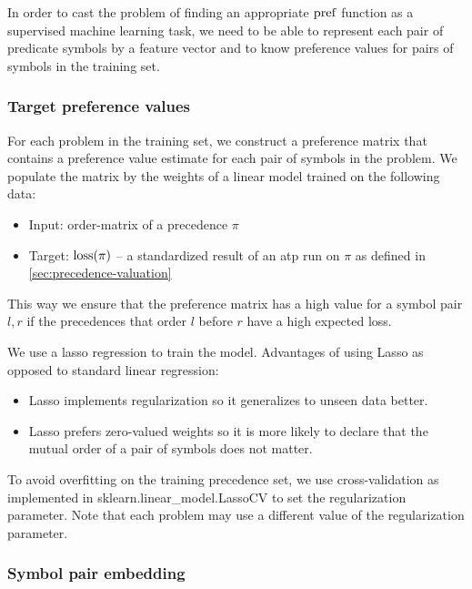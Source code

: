 In order to cast the problem of finding an appropriate \(\operatorname{pref}\) function
as a supervised machine learning task,
we need to be able to represent each pair of predicate symbols by a feature vector
and to know preference values for pairs of symbols in the training set.

\subsubsection{Target preference values}

For each problem in the training set, we construct a preference matrix that contains a preference
value estimate for each pair of symbols in the problem.
We populate the matrix by the weights of a linear model trained on the following data:

\begin{itemize}
	\item Input: \Gls{order-matrix} of a precedence \(\pi\)
	\item Target: \(\operatorname{loss}(\pi)\) --
	a standardized result of an \gls{atp} run on \(\pi\) as defined in \autoref{sec:precedence-valuation}
\end{itemize}

This way we ensure that the preference matrix has a high value for a symbol pair \(l, r\)
if the precedences that order \(l\) before \(r\) have a high expected loss.

We use a lasso regression \cite{?} to train the model.
Advantages of using Lasso as opposed to standard linear regression\cite{?}:

\begin{itemize}
	\item Lasso implements regularization so it generalizes to unseen data better.
	\item Lasso prefers zero-valued weights so it is more likely to declare that the mutual order of a pair of symbols does not matter.
\end{itemize}

To avoid overfitting on the training precedence set,
we use cross-validation as implemented in sklearn.linear\_model.LassoCV \cite{?}
to set the regularization parameter.
Note that each problem may use a different value of the regularization parameter.

\subsubsection{Symbol pair embedding}


